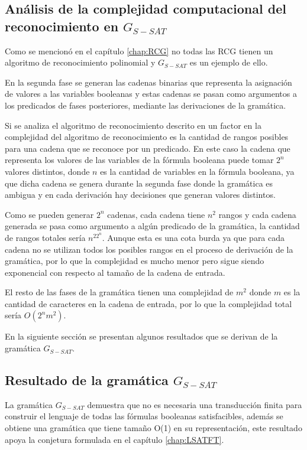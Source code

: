 \subsection{Análisis de la complejidad computacional del reconocimiento en $G_{S-SAT}$}

Como se mencionó en el capítulo \ref{chap:RCG} no todas las RCG tienen un algoritmo de reconocimiento polinomial y $G_{S-SAT}$ es un ejemplo de ello.

En la segunda fase se generan las cadenas binarias que representa la asignación de valores a las variables 
booleanas y estas cadenas se pasan como argumentos a los predicados de fases posteriores, mediante las derivaciones de 
la gramática.

Si se analiza el algoritmo de reconocimiento descrito en \cite{mainRCGBib} un factor en la complejidad del 
algoritmo de reconocimiento es la cantidad de rangos posibles para una cadena que se reconoce por un predicado. 
En este caso la cadena que representa los valores de las variables de la fórmula booleana puede tomar $2^n$
valores distintos, donde $n$ es la cantidad de variables en la fórmula booleana, ya que dicha cadena se genera 
durante la segunda fase donde la gramática es ambigua y en cada derivación hay decisiones que generan valores 
distintos.

Como se pueden generar $2^n$ cadenas, cada cadena tiene $n^2$ rangos y cada cadena generada se pasa como 
argumento a algún predicado de la gramática, la cantidad de rangos totales sería $n^22^n$. 
Aunque esta es una cota burda ya que para cada cadena no se utilizan todos los posibles rangos en el proceso de derivación de la gramática, por lo que la complejidad es mucho menor pero sigue siendo exponencial con respecto al tamaño de la cadena de entrada.

El resto de las fases de la gramática tienen una complejidad de $m^2$ donde $m$
es la cantidad de caracteres en la cadena de entrada, por lo que la complejidad total sería $O(2^nm^2)$.

En la siguiente sección se presentan algunos resultados que se derivan de la gramática $G_{S-SAT}$.

\subsection{Resultado de la gramática $G_{S-SAT}$}

La gramática $G_{S-SAT}$ demuestra que no es necesaria una transducción finita para construir el lenguaje
de todas las fórmulas booleanas satisfacibles, además se obtiene una gramática que tiene tamaño O(1) en su representación,
este resultado apoya la conjetura formulada en el capítulo \ref{chap:LSATFT}.

